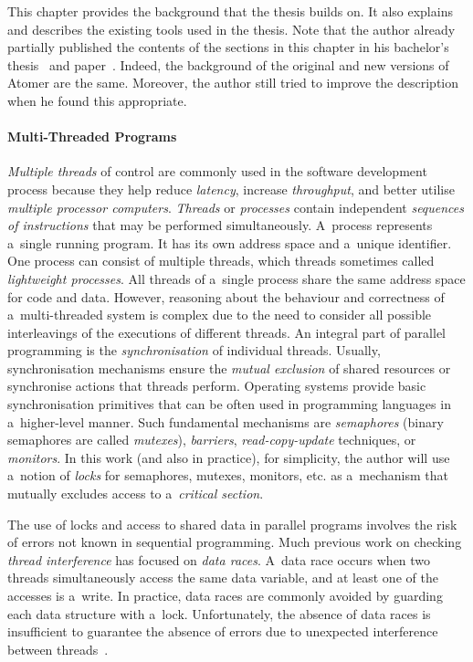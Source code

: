 This chapter provides the background that the thesis builds on. It also explains and describes the existing tools used in the thesis. Note that the author already partially published the contents of the sections in this chapter in his bachelor's thesis~\cite{harmimBP} and paper~\cite{excel2021Harmim}. Indeed, the background of the original and new versions of Atomer are the same. Moreover, the author still tried to improve the description when he found this appropriate.

\paragraph{Multi-Threaded Programs~\cite{atomizer, muzikovskaBP}}
\emph{Multiple threads} of control are commonly used in the software development process because they help reduce \emph{latency}, increase \emph{throughput}, and better utilise \emph{multiple processor computers}. \emph{Threads} or \emph{processes} contain independent \emph{sequences of instructions} that may be performed simultaneously. A~process represents a~single running program. It has its own address space and a~unique identifier. One process can consist of multiple threads, which threads sometimes called \emph{lightweight processes}. All threads of a~single process share the same address space for code and data. However, reasoning about the behaviour and correctness of a~multi-threaded system is complex due to the need to consider all possible interleavings of the executions of different threads. An integral part of parallel programming is the \emph{synchronisation} of individual threads. Usually, synchronisation mechanisms ensure the \emph{mutual exclusion} of shared resources or synchronise actions that threads perform. Operating systems provide basic synchronisation primitives that can be often used in programming languages in a~higher-level manner. Such fundamental mechanisms are \emph{semaphores} (binary semaphores are called \emph{mutexes}), \emph{barriers}, \emph{read-copy-update} techniques, or \emph{monitors}. In this work (and also in practice), for simplicity, the author will use a~notion of \emph{locks} for semaphores, mutexes, monitors, etc. as a~mechanism that mutually excludes access to a~\emph{critical section}.

The use of locks and access to shared data in parallel programs involves the risk of errors not known in sequential programming. Much previous work on checking \emph{thread interference} has focused on \emph{data races}. A~data race occurs when two threads simultaneously access the same data variable, and at least one of the accesses is a~write. In practice, data races are commonly avoided by guarding each data structure with a~lock. Unfortunately, the absence of data races is insufficient to guarantee the absence of errors due to unexpected interference between threads~\cite{atomizer, atomicityOOP}.


